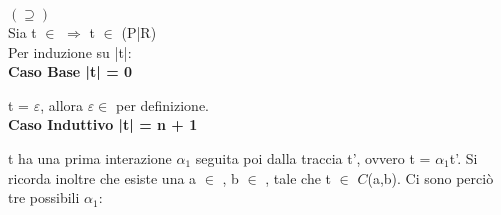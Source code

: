 $(\supseteq)$ 
\\

Sia t $\in$   $\Rightarrow$  t $\in$ (P|R)\\
Per induzione su |t|:\\

\textbf{Caso Base |t| = 0}

t = $\varepsilon$, allora $\varepsilon \in$  per definizione.\\


\textbf{Caso Induttivo |t| = n + 1}


t ha una prima interazione $\alpha_{1}$ seguita poi dalla traccia t', ovvero t = $\alpha_{1}$t'. Si ricorda inoltre che esiste una a $\in$ , b $\in$ , tale che t $\in$ $C$(a,b). Ci sono perciò tre possibili $\alpha_{1}$:

